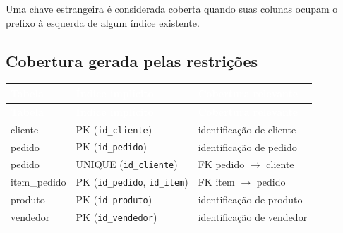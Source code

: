\documentclass[12pt,a4paper]{article}
\begin{document}
{	Uma chave estrangeira é considerada coberta quando suas colunas
	ocupam o prefixo à esquerda de algum índice existente.
	
	\subsection{Cobertura gerada pelas restrições}
	
	{\small
		\renewcommand{\arraystretch}{1.2}
		
		\begin{longtable}{
				|>{\raggedright\arraybackslash}p{4.2cm}|
				>{\raggedright\arraybackslash}p{5cm}|
				>{\raggedright\arraybackslash}p{5cm}|
			}
			
			\hline
			
			\rowcolor{AzulCorporativo}
			\textcolor{white}{\textbf{Tabela}}
			&
			\textcolor{white}{\textbf{Índice implícito}}
			&
			\textcolor{white}{\textbf{Cobertura relevante}}
			\\ \hline
			
			\endfirsthead
			
			\hline
			\rowcolor{AzulCorporativo}
			\textcolor{white}{\textbf{Tabela}}
			&
			\textcolor{white}{\textbf{Índice implícito}}
			&
			\textcolor{white}{\textbf{Cobertura relevante}}
			\\ \hline
			
			\endhead
			
			cliente
			&
			PK (\texttt{id\_cliente})
			&
			identificação de cliente
			\\ \hline
			
			pedido
			&
			PK (\texttt{id\_pedido})
			&
			identificação de pedido
			\\ \hline
			
			pedido
			&
			UNIQUE (\texttt{id\_cliente})
			&
			FK pedido $\rightarrow$ cliente
			\\ \hline
			
			item\_pedido
			&
			PK (\texttt{id\_pedido}, \texttt{id\_item})
			&
			FK item $\rightarrow$ pedido
			\\ \hline
			
			produto
			&
			PK (\texttt{id\_produto})
			&
			identificação de produto
			\\ \hline
			
			vendedor
			&
			PK (\texttt{id\_vendedor})
			&
			identificação de vendedor
			\\ \hline
			

\end{longtable}}}
\end{document}
